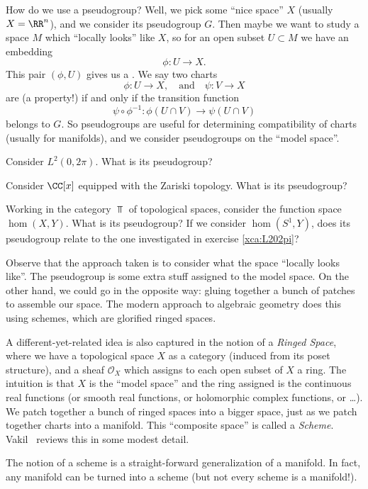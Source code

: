 How do we use a pseudogroup? Well, we pick some ``nice space''
$X$ (usually $X=\RR^n$), and we consider its pseudogroup
$G$. Then maybe we want to study a space $M$ which ``locally
looks'' like $X$, so for an open subset $U\subset M$ we have an
embedding
\begin{equation}
\phi\colon U\to X.
\end{equation}
This pair $(\phi,U)$ gives us a . We say two charts 
\begin{equation}
\phi\colon U\to X,\quad\mbox{and}\quad\psi\colon V\to X
\end{equation}
are  (a property!) if and only if the
transition function
\begin{equation}
\psi\circ\phi^{-1}\colon \phi(U\cap V)\to\psi(U\cap V)
\end{equation}
belongs to $G$. So pseudogroups are useful for determining
compatibility of charts (usually for manifolds), and we consider
pseudogroups on the ``model space''.

\begin{xca}\label{xca:L202pi}
Consider $L^{2}(0,2\pi)$. What is its pseudogroup?
\end{xca}
\begin{xca}
Consider $\CC[x]$ equipped with the Zariski topology. What is its pseudogroup?
\end{xca}
\begin{xca}
Working in the category $\Top$ of topological spaces, consider
the function space $\hom(X,Y)$. What is its pseudogroup? If we
consider $\hom(S^{1},Y)$, does its pseudogroup relate to the one
investigated in exercise \ref{xca:L202pi}?
\end{xca}

Observe that the approach taken is to consider what the space
``locally looks like''. The pseudogroup is some extra stuff
assigned to the model space. On the other hand, we could go in
the opposite way: gluing together a bunch of patches to assemble
our space. The modern approach to algebraic geometry does this
using schemes, which are glorified ringed spaces.

\begin{rmk}
A different-yet-related idea is also captured in the notion of a \emph{Ringed Space},
where we have a topological space $X$ as a category (induced from
its poset structure), and a sheaf $\mathcal{O}_{X}$ which assigns
to each open subset of $X$ a ring. The intuition is that $X$ is
the ``model space'' and the ring assigned is the continuous real
functions (or smooth real functions, or holomorphic complex functions, or
\dots). We patch together a bunch of ringed spaces into a bigger
space, just as we patch together charts into a manifold. This
``composite space'' is called a \emph{Scheme}. Vakil~\cite{vakil}
reviews this in some modest detail. 
\end{rmk}
\begin{rmk}
The notion of a scheme is a straight-forward generalization of a
manifold. In fact, any manifold can be turned into a scheme (but
not every scheme is a manifold!).
\end{rmk}

